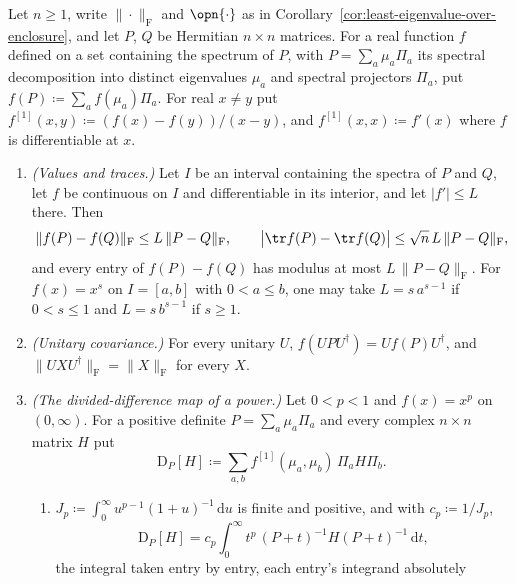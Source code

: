 \begin{lemma}\label{lem:matrix-function-perturbation}
Let $n\ge1$, write $\|\cdot\|_{\mathrm F}$ and $\opn{\cdot}$ as in
Corollary~\ref{cor:least-eigenvalue-over-enclosure}, and let $P$, $Q$ be
Hermitian $n\times n$ matrices. For a real function $f$ defined on a set
containing the spectrum of $P$, with $P=\sum_a\mu_a\Pi_a$ its spectral
decomposition into distinct eigenvalues $\mu_a$ and spectral projectors
$\Pi_a$, put $f(P)\coloneqq\sum_af(\mu_a)\Pi_a$. For real $x\ne y$ put
$f^{[1]}(x,y)\coloneqq(f(x)-f(y))/(x-y)$, and $f^{[1]}(x,x)\coloneqq f'(x)$
where $f$ is differentiable at $x$.
\begin{enumerate}[label=(\roman*),leftmargin=2.4em]
\item \emph{(Values and traces.)} Let $I$ be an interval containing the
  spectra of $P$ and $Q$, let $f$ be continuous on $I$ and differentiable in
  its interior, and let $|f'|\le L$ there. Then
  \begin{equation}\label{eq:mf-lipschitz}
    \|f(P)-f(Q)\|_{\mathrm F}\le L\,\|P-Q\|_{\mathrm F},
    \qquad
    \big|\tr f(P)-\tr f(Q)\big|\le\sqrt n\,L\,\|P-Q\|_{\mathrm F},
  \end{equation}
  and every entry of $f(P)-f(Q)$ has modulus at most
  $L\,\|P-Q\|_{\mathrm F}$. For $f(x)=x^{s}$ on $I=[a,b]$ with $0<a\le b$,
  one may take $L=s\,a^{s-1}$ if $0<s\le1$ and $L=s\,b^{s-1}$ if $s\ge1$.
\item \emph{(Unitary covariance.)} For every unitary $U$,
  $f(UPU^{\dagger})=Uf(P)U^{\dagger}$, and
  $\|UXU^{\dagger}\|_{\mathrm F}=\|X\|_{\mathrm F}$ for every $X$.
\item \emph{(The divided-difference map of a power.)} Let $0<p<1$ and
  $f(x)=x^{p}$ on $(0,\infty)$. For a positive definite $P=\sum_a\mu_a\Pi_a$
  and every complex $n\times n$ matrix $H$ put
  \begin{equation}\label{eq:dd-map}
    \mathrm{D}_P[H]\coloneqq\sum_{a,b}f^{[1]}(\mu_a,\mu_b)\,\Pi_aH\Pi_b .
  \end{equation}
  \begin{enumerate}[label=(\alph*),leftmargin=2.2em]
  \item $J_p\coloneqq\int_0^{\infty}u^{p-1}(1+u)^{-1}\,\mathrm du$ is finite
    and positive, and with $c_p\coloneqq1/J_p$,
    \begin{equation}\label{eq:dd-integral}
      \mathrm{D}_P[H]=c_p\int_0^{\infty}t^{p}\,(P+t)^{-1}H(P+t)^{-1}\,\mathrm dt,
    \end{equation}
    the integral taken entry by entry, each entry's integrand absolutely

\end{enumerate}
\end{enumerate}
\end{lemma}

